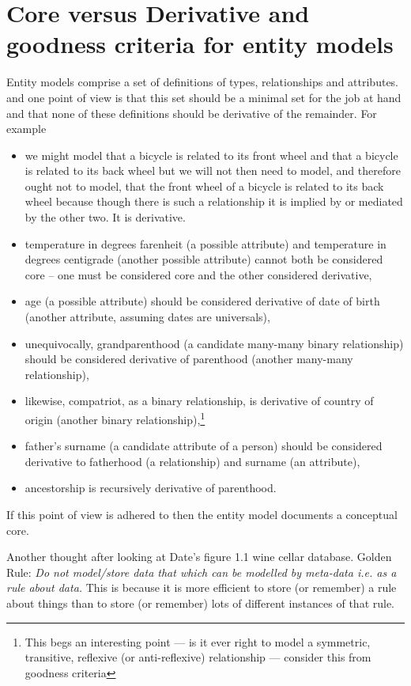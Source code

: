 
\section{Core versus Derivative \small and goodness criteria for entity models}
\label{CoreversusDerivative}
\mynote Entity models comprise a set of definitions of types, relationships and attributes. 
and one point of view is that this set should be a minimal set for the job at hand and that none of these definitions should be derivative of the remainder. For example
\begin{itemize}
\item we might model that a bicycle is related to its front wheel and that a bicycle is related to its back wheel but we will not then need to model,  and therefore ought not to model, that the front wheel of a bicycle is related to its back wheel because though there is such a relationship it is implied by or mediated by the other two. It is derivative.
\item temperature in degrees farenheit (a possible attribute) and temperature in degrees centigrade (another possible attribute) cannot both be considered core -- one must be considered core and the other considered derivative,
\item age (a possible attribute) should be considered derivative of date of birth (another attribute, assuming dates are universals),
\item unequivocally, grandparenthood (a candidate many-many binary relationship) should be considered derivative of parenthood (another many-many relationship),
\item likewise, compatriot, as a binary relationship, is derivative of country of origin (another binary relationship),\footnote{This begs an interesting point --- is it ever right to model a symmetric, transitive, reflexive (or anti-reflexive) relationship --- consider this from goodness criteria}
\item father's surname (a candidate attribute of a person)  should be considered derivative to fatherhood (a relationship) and surname (an attribute), 
\item ancestorship is recursively derivative of parenthood. 
\end{itemize}

If this point of view is adhered to then the entity model documents a conceptual core.

\mynote
Another thought after looking at Date's figure 1.1 wine cellar database.
Golden Rule: \textit{Do not model/store data that which can be modelled by meta-data i.e. as a rule about data.}
This is because it is more efficient to store (or remember)  a rule about
things than to store (or remember) lots of different instances of that rule.


